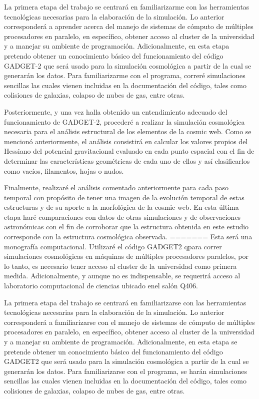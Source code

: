 \documentclass{article}
\begin{document}
La primera etapa del trabajo se centrará en familiarizarme con las herramientas tecnológicas necesarias para la elaboración de la simulación. Lo anterior corresponderá a aprender acerca del manejo de sistemas de cómputo de múltiples procesadores en paralelo, en específico, obtener acceso al cluster de la universidad y a manejar su ambiente de programación. Adicionalmente, en esta etapa pretendo obtener un conocimiento básico del funcionamiento del código GADGET-2 que será usado para la simulación cosmológica a partir de la cual se generarán los datos. Para familiarizarme con el programa, correré simulaciones sencillas las cuales vienen incluidas en la documentación del código, tales como colisiones de galaxias, colapso de nubes de gas, entre otras. 

Posteriormente, y una vez halla obtenido un entendimiento adecuado del funcionamiento de GADGET-2, procederé a realizar la simulación cosmológica necesaria para el análisis estructural de los elementos de la cosmic web. Como se mencionó anteriormente, el análisis consistirá en calcular los valores propios del Hessiano del potencial gravitacional evaluado en cada punto espacial con el fin de determinar las características geométricas de cada uno de ellos y así clasificarlos como vacíos, filamentos, hojas o nudos.

Finalmente, realizaré el análisis comentado anteriormente para cada paso temporal con propósito de tener una imagen de la evolución temporal de estas estructuras y de su aporte a la morfológica de la cosmic web. En esta última etapa haré comparaciones con datos de otras simulaciones y de observaciones astronómicas con el fin de corroborar que la estructura obtenida en este estudio corresponde con la estructura cosmológica observada.         
=======
Esta será una monografía computacional. Utilizar\'e el código
GADGET2 qpara correr simulaciones cosmológicas en máquinas de
múltiples procesadores paralelos, por lo tanto, es necesario tener
acceso al cluster de la universidad como primera
medida. Adicionalmente, y aunque no es indispensable, se requerirá
acceso al laboratorio computacional de ciencias ubicado enel salón
Q406.  
  
La primera etapa del trabajo se centrará en familiarizarse con las
herramientas tecnológicas necesarias para la elaboración de la
simulación. Lo anterior corresponderá a familiarizarse con el manejo
de sistemas de cómputo de múltiples procesadores en paralelo, en
específico, obtener acceso al cluster de la universidad y a manejar su
ambiente de programación. Adicionalmente, en esta etapa se pretende
obtener un conocimiento básico del funcionamiento del código GADGET2
que será usado para la simulación cosmológica a partir de la cual se
generarán los datos. Para familiarizarse con el programa, se harán
simulaciones sencillas las cuales vienen incluidas en la documentación
del código, tales como colisiones de galaxias, colapso de nubes de
gas, entre otras.  
\end{document}
